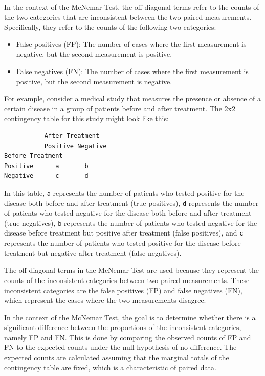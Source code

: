 \documentclass[
]{ctexart}
\begin{document}
In the context of the McNemar Test, the off-diagonal terms refer to the
counts of the two categories that are inconsistent between the two
paired measurements. Specifically, they refer to the counts of the
following two categories:

\begin{itemize}
\item
  False positives (FP): The number of cases where the first measurement
  is negative, but the second measurement is positive.
\item
  False negatives (FN): The number of cases where the first measurement
  is positive, but the second measurement is negative.
\end{itemize}

For example, consider a medical study that measures the presence or
absence of a certain disease in a group of patients before and after
treatment. The 2x2 contingency table for this study might look like
this:

\begin{verbatim}
           After Treatment
           Positive Negative
Before Treatment
Positive      a       b
Negative      c       d
\end{verbatim}

In this table, \texttt{a} represents the number of patients who tested
positive for the disease both before and after treatment (true
positives), \texttt{d} represents the number of patients who tested
negative for the disease both before and after treatment (true
negatives), \texttt{b} represents the number of patients who tested
negative for the disease before treatment but positive after treatment
(false positives), and \texttt{c} represents the number of patients who
tested positive for the disease before treatment but negative after
treatment (false negatives).

The off-diagonal terms in the McNemar Test are used because they
represent the counts of the inconsistent categories between two paired
measurements. These inconsistent categories are the false positives (FP)
and false negatives (FN), which represent the cases where the two
measurements disagree.

In the context of the McNemar Test, the goal is to determine whether
there is a significant difference between the proportions of the
inconsistent categories, namely FP and FN. This is done by comparing the
observed counts of FP and FN to the expected counts under the null
hypothesis of no difference. The expected counts are calculated assuming
that the marginal totals of the contingency table are fixed, which is a
characteristic of paired data.
\end{document}

